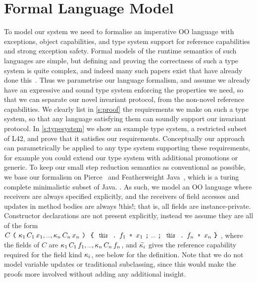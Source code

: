 \section{Formal Language Model}
\lstset{language=FortyFour} %
\label{s:formalism}
To model our system we need to formalise an imperative OO language
with exceptions, object capabilities, and type system
support for reference capabilities and strong exception safety.
Formal models of the runtime semantics of such languages are simple, but
defining and proving the correctness of such a type system 
is quite complex, and indeed many such papers exist that have already done this~\cite{ServettoEtAl13a,ServettoZucca15,GordonEtAl12,clebsch2015deny,JOT:issue_2011_01/article1}.
Thus we parametrise our language formalism, and assume we already have an expressive and sound type system enforcing the properties we need, so
that we can separate our novel invariant protocol, from the non-novel reference capabilities.
We clearly list in \ref{s:proof} the requirements we make on such a type system, so that any language satisfying them can soundly support our invariant protocol.
In \ref{s:typesystem} we show an example type system, a restricted subset of L42, and prove that it satisfies our requirements. Conceptually our approach can parametrically be applied to any type system supporting these requirements, for example you could extend our type system with additional promotions or generic.
To keep our small step reduction semantics as conventional as possible, we base our formalism on Pierce~\cite{pierce2002types} and Featherweight Java~\cite{IgarashiEtAl01}, which is a turing complete minimalistic subset of Java. . 
As such, we model an OO language where receivers are always specified explicitly, and the receivers of field accesses and updates in method bodies are always \Q!this!; that is, all fields are instance-private.
Constructor declarations are not present explicitly, instead we assume they are all of the form $C\oR \trange{\fmdf}{C}{x} \cR\oC \drange[\semicolon]{\Kw{this}\singleDot f}{\Kw{=}\,x} \cC$, where the fields of $C$ are $\trange{\fmdf}{C}{f}$, and $\widetilde{{\kappa}_i}$ gives the reference capability required for the field kind ${\kappa}_i$, see below for the definition.
Note that we do not model variable updates or traditional subclassing, since this would make the proofs more involved without adding any additional insight.

